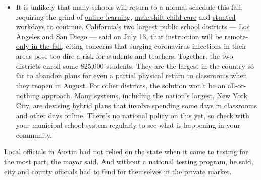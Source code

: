 \begin{itemize}
  \begin{itemize}
  \tightlist
  \item
    It is unlikely that many schools will return to a normal schedule
    this fall, requiring the grind of
    \href{https://www.nytimes.com/2020/06/05/us/coronavirus-education-lost-learning.html?action=click\&pgtype=Article\&state=default\&region=MAIN_CONTENT_3\&context=storylines_faq}{online
    learning},
    \href{https://www.nytimes.com/2020/05/29/us/coronavirus-child-care-centers.html?action=click\&pgtype=Article\&state=default\&region=MAIN_CONTENT_3\&context=storylines_faq}{makeshift
    child care} and
    \href{https://www.nytimes.com/2020/06/03/business/economy/coronavirus-working-women.html?action=click\&pgtype=Article\&state=default\&region=MAIN_CONTENT_3\&context=storylines_faq}{stunted
    workdays} to continue. California's two largest public school
    districts --- Los Angeles and San Diego --- said on July 13, that
    \href{https://www.nytimes.com/2020/07/13/us/lausd-san-diego-school-reopening.html?action=click\&pgtype=Article\&state=default\&region=MAIN_CONTENT_3\&context=storylines_faq}{instruction
    will be remote-only in the fall}, citing concerns that surging
    coronavirus infections in their areas pose too dire a risk for
    students and teachers. Together, the two districts enroll some
    825,000 students. They are the largest in the country so far to
    abandon plans for even a partial physical return to classrooms when
    they reopen in August. For other districts, the solution won't be an
    all-or-nothing approach.
    \href{https://bioethics.jhu.edu/research-and-outreach/projects/eschool-initiative/school-policy-tracker/}{Many
    systems}, including the nation's largest, New York City, are
    devising
    \href{https://www.nytimes.com/2020/06/26/us/coronavirus-schools-reopen-fall.html?action=click\&pgtype=Article\&state=default\&region=MAIN_CONTENT_3\&context=storylines_faq}{hybrid
    plans} that involve spending some days in classrooms and other days
    online. There's no national policy on this yet, so check with your
    municipal school system regularly to see what is happening in your
    community.
  \end{itemize}
\end{itemize}

Local officials in Austin had not relied on the state when it came to
testing for the most part, the mayor said. And without a national
testing program, he said, city and county officials had to fend for
themselves in the private market.

